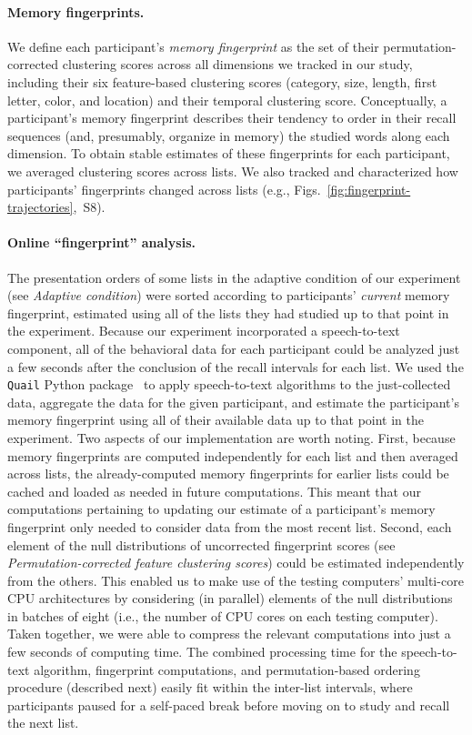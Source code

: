 \documentclass[11pt]{article}
\newcommand{\fingerprintTrajectoryRandom}{S8}
\begin{document}
\paragraph*{Memory fingerprints.}

We define each participant's \textit{memory fingerprint} as the set of their
permutation-corrected clustering scores across all dimensions we tracked in our
study, including their six feature-based clustering scores (category, size,
length, first letter, color, and location) and their temporal clustering score.
Conceptually, a participant's memory fingerprint describes their tendency to
order in their recall sequences (and, presumably, organize in memory) the
studied words along each dimension. To obtain stable estimates of these
fingerprints for each participant, we averaged clustering scores across lists.
We also tracked and characterized how participants' fingerprints changed across
lists (e.g.,
Figs.~\ref{fig:fingerprint-trajectories},~\fingerprintTrajectoryRandom).

\paragraph{Online ``fingerprint'' analysis.}

The presentation orders of some lists in the adaptive condition of our
experiment (see \textit{Adaptive condition}) were sorted according to
participants' \textit{current} memory fingerprint, estimated using all of the
lists they had studied up to that point in the experiment. Because our
experiment incorporated a speech-to-text component, all of the behavioral data
for each participant could be analyzed just a few seconds after the conclusion
of the recall intervals for each list. We used the \texttt{Quail} Python
package~\citep{HeusEtal17} to apply speech-to-text algorithms to the
just-collected data, aggregate the data for the given participant, and estimate
the participant's memory fingerprint using all of their available data up to
that point in the experiment. Two aspects of our implementation are worth
noting. First, because memory fingerprints are computed independently for each
list and then averaged across lists, the already-computed memory fingerprints
for earlier lists could be cached and loaded as needed in future computations.
This meant that our computations pertaining to updating our estimate of a
participant's memory fingerprint only needed to consider data from the most
recent list. Second, each element of the null distributions of uncorrected
fingerprint scores (see \textit{Permutation-corrected feature clustering
scores}) could be estimated independently from the others. This enabled us to
make use of the testing computers' multi-core CPU architectures by considering
(in parallel) elements of the null distributions in batches of eight (i.e., the
number of CPU cores on each testing computer). Taken together, we were able to
compress the relevant computations into just a few seconds of computing time.
The combined processing time for the speech-to-text algorithm, fingerprint
computations, and permutation-based ordering procedure (described next) easily
fit within the inter-list intervals, where participants paused for a self-paced
break before moving on to study and recall the next list.
\end{document}
